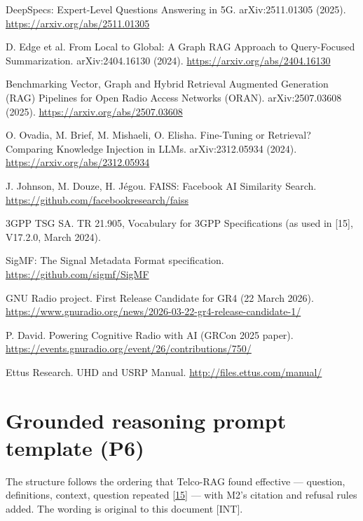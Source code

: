 \documentclass[11pt,a4paper]{article}
\newcommand{\prov}[1]{\textsf{\footnotesize[#1]}}
\begin{document}
\begin{description}[leftmargin=3.2em,labelwidth=2.8em,labelsep=0.4em,font=\normalfont,itemsep=3pt]
\item[{[20]}] \hypertarget{ref20}{}DeepSpecs: Expert-Level Questions Answering in 5G. arXiv:2511.01305 (2025). \url{https://arxiv.org/abs/2511.01305}
\item[{[21]}] \hypertarget{ref21}{}D. Edge et al. From Local to Global: A Graph RAG Approach to Query-Focused Summarization. arXiv:2404.16130 (2024). \url{https://arxiv.org/abs/2404.16130}
\item[{[22]}] \hypertarget{ref22}{}Benchmarking Vector, Graph and Hybrid Retrieval Augmented Generation (RAG) Pipelines for Open Radio Access Networks (ORAN). arXiv:2507.03608 (2025). \url{https://arxiv.org/abs/2507.03608}
\item[{[23]}] \hypertarget{ref23}{}O. Ovadia, M. Brief, M. Mishaeli, O. Elisha. Fine-Tuning or Retrieval? Comparing Knowledge Injection in LLMs. arXiv:2312.05934 (2024). \url{https://arxiv.org/abs/2312.05934}
\item[{[24]}] \hypertarget{ref24}{}J. Johnson, M. Douze, H. J\'egou. FAISS: Facebook AI Similarity Search. \url{https://github.com/facebookresearch/faiss}
\item[{[25]}] \hypertarget{ref25}{}3GPP TSG SA. TR 21.905, Vocabulary for 3GPP Specifications (as used in [15], V17.2.0, March 2024).
\item[{[26]}] \hypertarget{ref26}{}SigMF: The Signal Metadata Format specification. \url{https://github.com/sigmf/SigMF}
\item[{[27]}] \hypertarget{ref27}{}GNU Radio project. First Release Candidate for GR4 (22 March 2026). \url{https://www.gnuradio.org/news/2026-03-22-gr4-release-candidate-1/}
\item[{[28]}] \hypertarget{ref28}{}P. David. Powering Cognitive Radio with AI (GRCon 2025 paper). \url{https://events.gnuradio.org/event/26/contributions/750/}
\item[{[29]}] \hypertarget{ref29}{}Ettus Research. UHD and USRP Manual. \url{http://files.ettus.com/manual/}
\end{description}
\clearpage
\appendix
\section{Grounded reasoning prompt template (P6)}
The structure follows the ordering that Telco-RAG found effective --- question, definitions, context, question repeated \hyperlink{ref15}{[15]} --- with M2's citation and refusal rules added. The wording is original to this document \prov{INT}.
\end{document}
